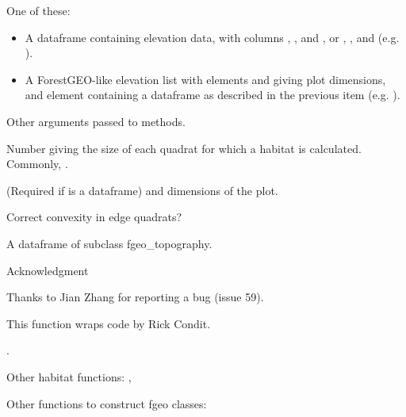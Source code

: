 \documentclass[a4paper]{book}
\begin{document}
\begin{Arguments}
\begin{ldescription}
\item[\code{elev}] One of these:
\begin{itemize}

\item A dataframe containing elevation data, with columns , , and
, or , , and  (e.g. ).
\item A ForestGEO-like elevation list with elements  and  giving
plot dimensions, and element  containing a dataframe as described in
the previous item (e.g. ).

\end{itemize}


\item[\code{...}] Other arguments passed to methods.

\item[\code{gridsize}] Number giving the size of each quadrat for which a habitat
is calculated. Commonly, .

\item[\code{xdim, ydim}] (Required if  is a dataframe)  and 
dimensions of the plot.

\item[\code{edgecorrect}] Correct convexity in edge quadrats?
\end{ldescription}
\end{Arguments}
%
\begin{Value}
A dataframe of subclass fgeo\_topography.
\end{Value}
%
\begin{Section}{Acknowledgment}

Thanks to Jian Zhang for reporting a bug (issue 59).
\end{Section}
%
\begin{Author}\relax
This function wraps code by Rick Condit.
\end{Author}
%
\begin{SeeAlso}\relax
{}.

Other habitat functions: ,

Other functions to construct fgeo classes: 
\end{SeeAlso}
\end{document}
